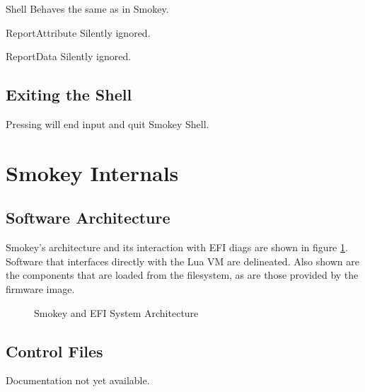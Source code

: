 \begin{Descriptive}

	\item[Shell] Behaves the same as in Smokey.

	\item[ReportAttribute] Silently ignored.

	\item[ReportData] Silently ignored.

\end{Descriptive}

\subsection{Exiting the Shell}

Pressing \KeyCapsCtrlD{} will end input and quit Smokey Shell.


\section{Smokey Internals}

\subsection{Software Architecture}

Smokey's architecture and its interaction with EFI diags are shown in figure
\ref{fig:SystemArchitecture}.  Software that interfaces directly with the Lua
VM are delineated.  Also shown are the components that are loaded from the
filesystem, as are those provided by the firmware image.

\begin{figure}[p]
\begin{FullWidth}


	\caption{Smokey and EFI System Architecture}
	\label{fig:SystemArchitecture}

\end{FullWidth}
\end{figure}

\subsection{Control Files}

Documentation not yet available.

